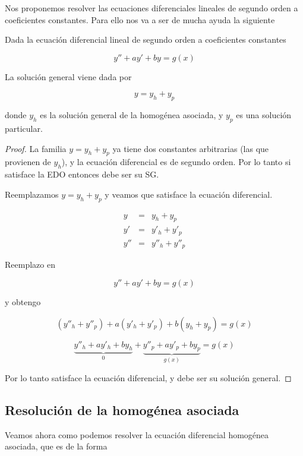 Nos proponemos resolver las ecuaciones diferenciales lineales de segundo orden a coeficientes constantes.  Para ello nos va a ser de mucha ayuda la siguiente

\begin{proposition}

Dada la ecuación diferencial lineal de segundo orden a coeficientes constantes

$$ y'' + ay' + by = g(x) $$

La solución general viene dada por 

$$ y = y_h + y_p$$

donde $y_h$ es la solución general de la homogénea asociada, y $y_p$ es una solución particular.

\end{proposition}

\begin{proof}

La familia $y = y_h + y_p$ ya tiene dos constantes arbitrarias (las que provienen de $y_h$), y la ecuación diferencial es de segundo orden.  Por lo tanto si satisface la EDO entonces debe ser su SG.

Reemplazamos $y = y_h + y_p$ y veamos que satisface la ecuación diferencial.

\begin{eqnarray*} y &=& y_h + y_p \\
y' &=& y'_h + y'_p \\
y'' &=& y''_h + y''_p \end{eqnarray*}

Reemplazo en 

$$ y'' + ay' + by = g(x) $$

y obtengo

$$ (y''_h + y''_p) + a(y'_h + y'_p) + b(y_h + y_p) = g(x) $$

$$ \underbrace{y''_h + ay'_h + by_h}_{0} + \underbrace{y''_p + ay'_p + by_p}_{g(x)} = g(x) $$

Por lo tanto satisface la ecuación diferencial, y debe ser su solución general.

\end{proof}

\subsection{Resolución de la homogénea asociada}

Veamos ahora como podemos resolver la ecuación diferencial homogénea asociada, que es de la forma

